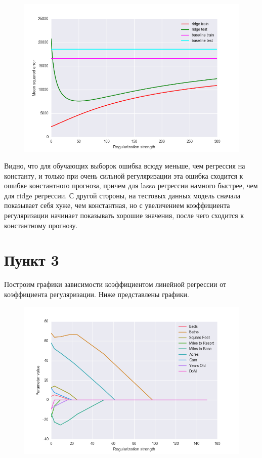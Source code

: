 \documentclass[a4paper, 12pt, oneside]{scrartcl}
\numberwithin{equation}{section}
\numberwithin{table}{section}
\numberwithin{figure}{section}
\begin{document}
\begin{figure}[h]
    \centering
    \includegraphics[width=\linewidth]{rss_ridge.png}
\end{figure}

\newpage
Видно, что для обучающих выборок ошибка всюду меньше, чем регрессия на константу, и только при очень сильной регуляризации эта ошибка сходится 
к ошибке константного прогноза, причем для lasso регрессии намного быстрее, чем для ridge регрессии. С другой стороны, на тестовых данных модель сначала 
показывает себя хуже, чем константная, но с увеличением коэффициента регуляризации начинает показывать хорошие значения, после чего сходится к константному прогнозу.

\section{Пункт 3}
Построим графики зависимости коэффициентом линейной регрессии от коэффициента регуляризации. Ниже представлены графики.
\begin{figure}[H]
    \centering
    \includegraphics[width=\linewidth]{Lasso_params.png}
\end{figure}
\end{document}
